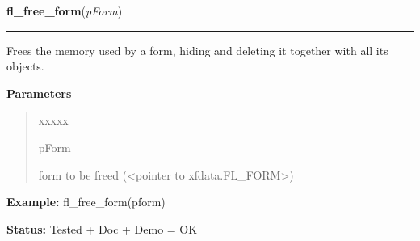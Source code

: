     \label{xformslib:library:fl_free_form}

    \vspace{0.5ex}

\hspace{.8\funcindent}\begin{boxedminipage}{\funcwidth}

    \raggedright \textbf{fl\_free\_form}(\textit{pForm})

    \vspace{-1.5ex}

    \rule{\textwidth}{0.5\fboxrule}
\setlength{\parskip}{2ex}
    Frees the memory used by a form, hiding and deleting it together with 
    all its objects.

\setlength{\parskip}{1ex}
      \textbf{Parameters}
      \vspace{-1ex}

      \begin{quote}
        \begin{Ventry}{xxxxx}

          \item[pForm]

          form to be freed ({\textless}pointer to 
          xfdata.FL\_FORM{\textgreater})

        \end{Ventry}

      \end{quote}

\textbf{Example:} fl\_free\_form(pform)



\textbf{Status:} Tested + Doc + Demo = OK



    \end{boxedminipage}

    \label{xformslib:library:fl_redraw_form}

    \vspace{0.5ex}

